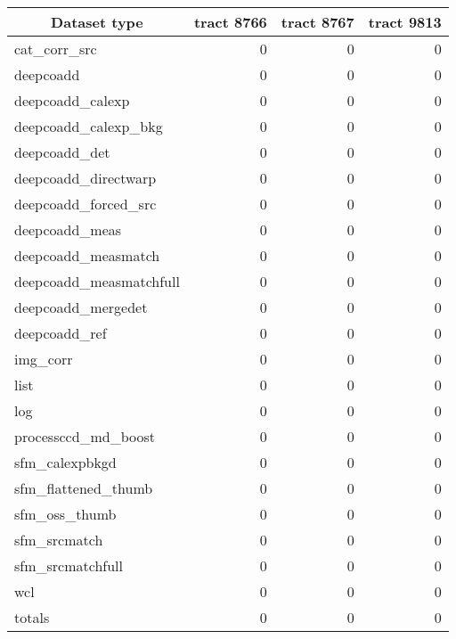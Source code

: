 \begin{table}
	\caption{
		Zero size file counts. In the absence of processing errors such files
		should not appear thus the table shows only the actual number of such
		files. Symbol \dag{} denotes DESDM specific dataset types.
	}
	\label{tab:zero}
	\small
	\begin{longtable}{lrrr}
		\hline\hline
		\multicolumn{1}{c}{\textbf{Dataset type}} &
		\multicolumn{1}{c}{\textbf{tract 8766}}   &
		\multicolumn{1}{c}{\textbf{tract 8767}}   &
		\multicolumn{1}{c}{\textbf{tract 9813}}   \\
		\hline\hline
		cat\_corr\_src & 0 & 0 & 0 \\
		deepcoadd & 0 & 0 & 0 \\
		deepcoadd\_calexp & 0 & 0 & 0 \\
		deepcoadd\_calexp\_bkg & 0 & 0 & 0 \\
		deepcoadd\_det & 0 & 0 & 0 \\
		deepcoadd\_directwarp & 0 & 0 & 0 \\
		deepcoadd\_forced\_src & 0 & 0 & 0 \\
		deepcoadd\_meas & 0 & 0 & 0 \\
		deepcoadd\_measmatch & 0 & 0 & 0 \\
		deepcoadd\_measmatchfull & 0 & 0 & 0 \\
		deepcoadd\_mergedet & 0 & 0 & 0 \\
		deepcoadd\_ref & 0 & 0 & 0 \\
		img\_corr & 0 & 0 & 0 \\
		list\dag & 0 & 0 & 0 \\
		log\dag & 0 & 0 & 0 \\
		processccd\_md\_boost & 0 & 0 & 0 \\
		sfm\_calexpbkgd & 0 & 0 & 0 \\
		sfm\_flattened\_thumb & 0 & 0 & 0 \\
		sfm\_oss\_thumb & 0 & 0 & 0 \\
		sfm\_srcmatch & 0 & 0 & 0 \\
		sfm\_srcmatchfull & 0 & 0 & 0 \\
		wcl\dag & 0 & 0 & 0 \\
		\hline
		totals & 0 & 0 & 0 \\
		\hline\hline
	\end{longtable}
\end{table}
